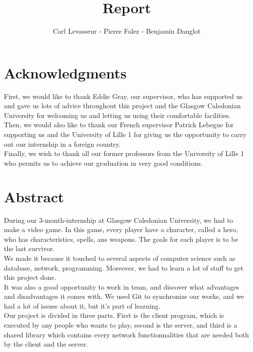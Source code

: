 \documentclass{scrreprt}
\author{Carl Levasseur - Pierre Falez - Benjamin Danglot}
\title{Report}
\begin{document}
\maketitle{}

\chapter*{Acknowledgments} %
First, we would like to thank Eddie Gray, our supervisor, who has supported us and
gave us lots of advice throughout this project and the Glasgow Caledonian University for
welcoming us and letting us using their comfortable facilities.\\

	  Then, we would also like to thank our French supervisor Patrick Lebegue for supporting us
	  and the University of Lille 1 for giving us the opportunity to carry out our internship in a
	  foreign country.\\

	  Finally, we wish to thank all our former professors from the University of Lille 1 who
	  permits us to achieve our graduation in very good conditions.\\

	  \chapter*{Abstract}
	  During our 3-month-internship at Glasgow Caledonian University, we had to make a video game.
	  In this game, every player have a character, called a hero, who has characteristics, spells, ans weapons.
	  The goals for each player is to be the last survivor.\\

	  We made it because it touched to several aspects of computer science such as database, network,
	  programming. Moreover, we had to learn a lot of stuff to get this project done.\\
		  It was also a good opportunity to work in team, and discover what advantages and disadvantages it comes with.
		  We used Git to synchronize our works, and we had a lot of issues about it, but it's part of learning.\\

		  Our project is divided in three parts. First is the client program, which is executed by any people who wants to play,
		  second is the server, and third is a shared library which contains every network functionnalities that are needed both
		  by the client and the server.\\
\end{document}
